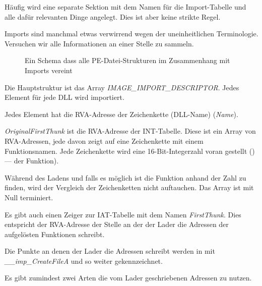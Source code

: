 
Häufig wird eine separate Sektion mit dem Namen  für die Import-Tabelle
und alle dafür relevanten Dinge angelegt. Dies ist aber keine strikte Regel.

Imports sind manchmal etwas verwirrend wegen der uneinheitlichen Terminologie.
Versuchen wir alle Informationen an einer Stelle zu sammeln.

\begin{figure}[H]
\centering
{}
\caption{
Ein Schema dass alle PE-Datei-Strukturen im Zusammenhang mit Imports vereint}
\end{figure}

Die Hauptstruktur ist das Array \emph{IMAGE\_IMPORT\_DESCRIPTOR}. Jedes Element für
jede DLL wird importiert.

Jedes Element hat die \ac{RVA}-Adresse der Zeichenkette (DLL-Name) (\emph{Name}).

\emph{OriginalFirstThunk} ist die \ac{RVA}-Adresse der \ac{INT}-Tabelle. Diese ist
ein Array von \ac{RVA}-Adressen, jede davon zeigt auf eine Zeichenkette mit einem
Funktionsnamen. Jede Zeichenkette wird eine 16-Bit-Integerzahl voran gestellt
()--- der Funktion).

Während des Ladens und falls es möglich ist die Funktion anhand der Zahl zu finden,
wird der Vergleich der Zeichenketten nicht auftauchen. Das Array ist mit Null terminiert.

Es gibt auch einen Zeiger zur \ac{IAT}-Tabelle mit dem Namen \emph{FirstThunk}. Dies
entspricht der \ac{RVA}-Adresse der Stelle an der der Lader die Adressen der aufgelösten
Funktionen schreibt.

Die Punkte an denen der Lader die Adressen schreibt werden in \IDA mit \emph{\_\_imp\_CreateFileA}
und so weiter gekennzeichnet.

Es gibt zumindest zwei Arten die vom Lader geschriebenen Adressen zu nutzen.

